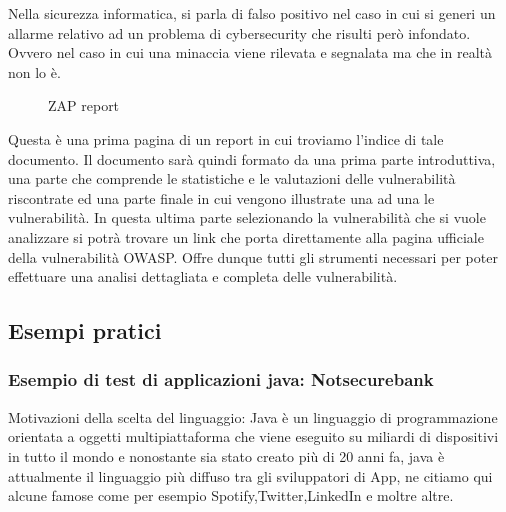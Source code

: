 Nella sicurezza informatica, si parla di falso positivo nel caso in cui si generi un allarme relativo ad un problema di cybersecurity che risulti però infondato. Ovvero nel caso in cui una minaccia viene rilevata e segnalata ma che in realtà non lo è.
\begin{figure}[H]
    \caption{ZAP report}
    \label{fig:report}
\end{figure}
Questa è una prima pagina di un report in cui troviamo l’indice di tale documento. Il documento sarà quindi formato da una prima parte introduttiva, una parte che comprende le statistiche e le valutazioni delle vulnerabilità riscontrate ed una parte finale in cui vengono illustrate una ad una le vulnerabilità. In questa ultima parte selezionando la vulnerabilità che si vuole analizzare si potrà trovare un link che porta direttamente alla pagina ufficiale della vulnerabilità OWASP. 
Offre dunque tutti gli strumenti necessari per poter effettuare una analisi dettagliata e completa delle vulnerabilità. 
\subsection{Esempi pratici} 
\subsubsection{Esempio di test di applicazioni java: Notsecurebank}
Motivazioni della scelta del linguaggio: Java è un linguaggio di programmazione orientata a oggetti multipiattaforma che viene eseguito su miliardi di dispositivi in tutto il mondo e nonostante sia stato creato più di 20 anni fa, java è attualmente il linguaggio più diffuso tra gli sviluppatori di App, ne citiamo qui alcune famose come per esempio Spotify,Twitter,LinkedIn e moltre altre. 

